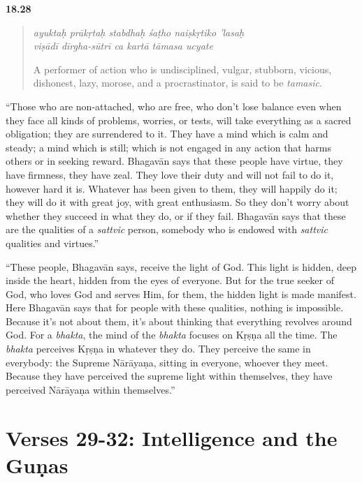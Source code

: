 \par\noindent\textbf{18.28}\par
\begin{verse}
\textit{ayuktaḥ prākṛtaḥ stabdhaḥ śaṭho naiṣkṛtiko ’lasaḥ} \\
\textit{viṣādī dīrgha-sūtrī ca kartā tāmasa ucyate}

\noindent A performer of action who is undisciplined, vulgar, stubborn, vicious, dishonest, lazy, morose, and a procrastinator, is said to be \textit{tamasic}.
\end{verse}
\par


\enquote{Those who are non-attached, who are free, who don’t lose balance even when they face all kinds of problems, worries, or tests, will take everything as a sacred obligation; they are surrendered to it. They have a mind which is calm and steady; a mind which is still; which is not engaged in any action that harms others or in seeking reward. Bhagavān says that these people have virtue, they have firmness, they have zeal. They love their duty and will not fail to do it, however hard it is. Whatever has been given to them, they will happily do it; they will do it with great joy, with great enthusiasm. So they don’t worry about whether they succeed in what they do, or if they fail. Bhagavān says that these are the qualities of a \textit{sattvic} person, somebody who is endowed with \textit{sattvic} qualities and virtues.}

\enquote{These people, Bhagavān says, receive the light of God. This light is hidden, deep inside the heart, hidden from the eyes of everyone. But for the true seeker of God, who loves God and serves Him, for them, the hidden light is made manifest. Here Bhagavān says that for people with these qualities, nothing is impossible. Because it’s not about them, it’s about thinking that everything revolves around God. For a \textit{bhakta}, the mind of the \textit{bhakta} focuses on Kṛṣṇa all the time. The \textit{bhakta} perceives Kṛṣṇa in whatever they do. They perceive the same in everybody: the Supreme Nārāyaṇa, sitting in everyone, whoever they meet. Because they have perceived the supreme light within themselves, they have perceived Nārāyaṇa within themselves.}

\newpage

\section{Verses 29-32: Intelligence and the Guṇas}\label{sec-verses-29-32-intelligence-and-the-gunas}


